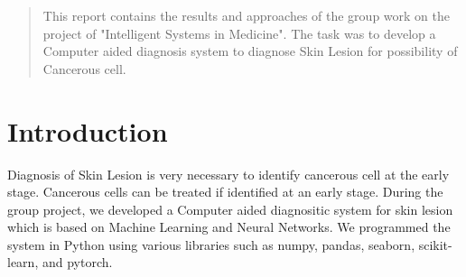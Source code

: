 \documentclass[conference]{IEEEtran}
\begin{document}
\begin{abstract}
This report contains the results and approaches of the group work on the project of "Intelligent Systems in Medicine". The task was to develop a Computer aided diagnosis system to diagnose Skin Lesion for possibility of Cancerous cell. 
\end{abstract}





%
\IEEEpeerreviewmaketitle



\section{Introduction}
Diagnosis of Skin Lesion is very necessary to identify cancerous cell at the early stage. Cancerous cells can be treated if identified at an early stage. During the group project, we developed a Computer aided diagnositic system for skin lesion which is based on Machine Learning and Neural Networks. We programmed the system in Python using various libraries such as numpy, pandas, seaborn, scikit-learn, and pytorch.



%
%
\end{document}

